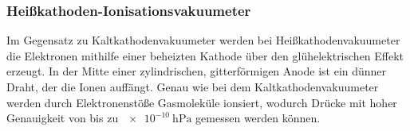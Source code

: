 \subsubsection{Heißkathoden-Ionisationsvakuumeter}
\label{subsubsec:heißkathode}

Im Gegensatz zu Kaltkathodenvakuumeter werden bei Heißkathodenvakuumeter die Elektronen mithilfe einer beheizten Kathode über den glühelektrischen Effekt erzeugt.
In der Mitte einer zylindrischen, gitterförmigen Anode ist ein dünner Draht, der die Ionen auffängt. Genau wie bei dem Kaltkathodenvakuumeter werden durch Elektronenstöße Gasmoleküle ionsiert, wodurch 
Drücke mit hoher Genauigkeit von bis zu $\SI{e-10}{\hecto\pascal}$ gemessen werden können.